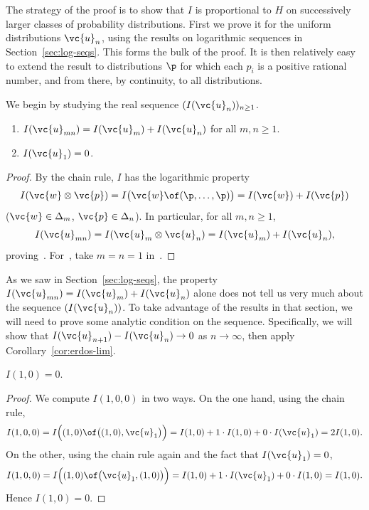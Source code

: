 The strategy of the proof is to show that $I$ is proportional to $H$ on
successively larger classes of probability distributions.  First we prove
it for the uniform distributions $\vc{u}_n$, using the results on
logarithmic sequences in Section~\ref{sec:log-seqs}.  This forms the bulk
of the proof.  It is then relatively easy to extend the result to
distributions $\p$ for which each $p_i$ is a positive rational number, and
from there, by continuity, to all distributions.

We begin by studying the real sequence $(I(\vc{u}_n))_{n \geq 1}$.

\begin{lemma}
\begin{enumerate}
\item 
{}
$I(\vc{u}_{mn}) = I(\vc{u}_m) + I(\vc{u}_n)$ for all $m, n \geq 1$.

\item
{}
$I(\vc{u}_1) = 0$.
\end{enumerate}
\end{lemma}

\begin{proof}
By the chain rule, $I$ has the logarithmic property
\[
I(\vc{w} \otimes \vc{p}) =
I\bigl(\vc{w} \of (\p, \ldots, \p)\bigr) =
I(\vc{w}) + I(\vc{p})
\]
($\vc{w} \in \Delta_m$, $\vc{p} \in \Delta_n$).  In particular,
for all $m, n \geq 1$,
\[
I(\vc{u}_{mn}) 
= 
I(\vc{u}_m \otimes \vc{u}_n) 
=
I(\vc{u}_m) + I(\vc{u}_n),
\]
proving~.  For~, take $m = n = 1$
in~.
\end{proof}

As we saw in Section~\ref{sec:log-seqs}, the property $I(\vc{u}_{mn}) =
I(\vc{u}_m) + I(\vc{u}_n)$ alone does not tell us very much about the
sequence $(I(\vc{u}_n))$.  To take advantage of the results in that
section, we will need to prove some analytic condition on the sequence.
Specifically, we will show that $I(\vc{u}_{n + 1}) - I(\vc{u}_n) \to 0$ as
$n \to \infty$, then apply Corollary~\ref{cor:erdos-lim}.
\pagebreak

\begin{lemma}
$I(1, 0) = 0$.
\end{lemma}

\begin{proof}
We compute $I(1, 0, 0)$ in two ways.  On the one hand, using the chain rule,
\[
I(1, 0, 0)
=
I\Bigl((1, 0) \of \bigl((1, 0), \vc{u}_1\bigr)\Bigr)
=
I(1, 0) + 1 \cdot I(1, 0) + 0 \cdot I(\vc{u}_1)
=
2I(1, 0).
\]
On the other, using the chain rule again and the fact that $I(\vc{u}_1) = 0$,
\[
I(1, 0, 0)
=
I\Bigl((1, 0) \of \bigl(\vc{u}_1, (1, 0)\bigr)\Bigr)
=
I(1, 0) + 1 \cdot I(\vc{u}_1) + 0 \cdot I(1, 0)
=
I(1, 0).
\]
Hence $I(1, 0) = 0$.
\end{proof}

